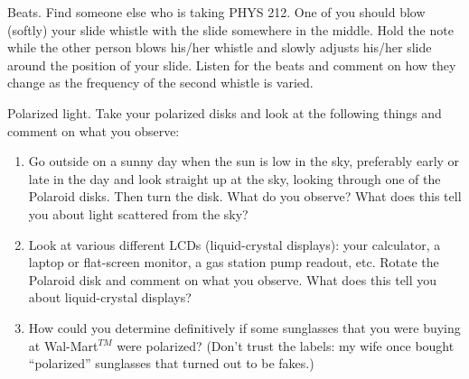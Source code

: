\begin{aproblem}{Beats.}  
  Find someone else who is taking PHYS 212. One of you should blow
  (softly) your slide whistle with the slide somewhere in the
  middle. Hold the note while the other person blows his/her whistle
  and slowly adjusts his/her slide around the position of your slide.
  Listen for the beats and comment on how they change as the frequency
  of the second whistle is varied.
\end{aproblem}


\begin{aproblem}{Polarized light.}  
  Take your polarized disks and look at the following things and
  comment on what you observe:
  \begin{enumerate}
  \item Go outside on a sunny day when the sun is low in the sky,
    preferably early or late in the day and look straight up at the
    sky, looking through one of the Polaroid disks.  Then turn the
    disk.  What do you observe?  What does this tell you about light
    scattered from the sky?
  \item Look at various different LCDs (liquid-crystal displays): your
    calculator, a laptop or flat-screen monitor, a gas station pump
    readout, etc.  Rotate the Polaroid disk and comment on what you
    observe.  What does this tell you about liquid-crystal displays?
  \item How could you determine definitively if some sunglasses that
    you were buying at Wal-Mart$^{TM}$ were polarized?  (Don't trust
    the labels: my wife once bought ``polarized'' sunglasses that
    turned out to be fakes.)
  \end{enumerate}
\end{aproblem}

\newpage

